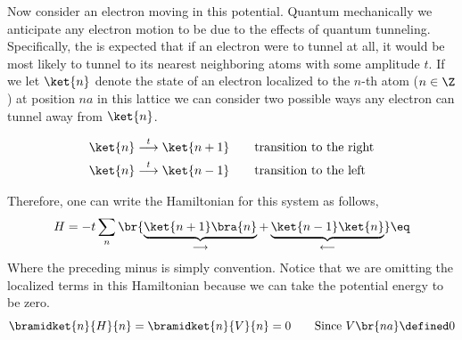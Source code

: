 \documentclass{article}
\begin{document}
\begin{center}
\end{center}


Now consider an electron moving in this potential. Quantum mechanically we anticipate any electron motion to be due to the effects of quantum tunneling. Specifically, the is expected that if an electron were to tunnel at all, it would be most likely to tunnel to its nearest neighboring atoms with some amplitude $t$. If we let $\ket{n}$ denote the state of an electron localized to the $n$-th atom ($n \in \Z$) at position $na$ in this lattice we can consider two possible ways any electron can tunnel away from $\ket{n}$.

\begin{alignat*}{2}
    \ket{n} &\stackrel{t}{\longrightarrow} \ket{n+1} \quad &&\text{transition to the right} \\
    \ket{n} &\stackrel{t}{\longrightarrow} \ket{n-1} \quad &&\text{transition to the left}
\end{alignat*}

Therefore, one can write the Hamiltonian for this system as follows,
\[ H = -t \sum_{n}\br{\underbrace{\ket{n+1}\bra{n}}_{\longrightarrow} + \underbrace{\ket{n-1}\ket{n}}_{\longleftarrow}} \eq \label{eq:toy_hamiltonian}\]
Where the preceding minus is simply convention. Notice that we are omitting the localized terms in this Hamiltonian because we can take the potential energy to be zero.
\[ \bramidket{n}{H}{n} = \bramidket{n}{V}{n} = 0 \qquad \text{Since $V\br{na} \defined 0$} \]
\end{document}
